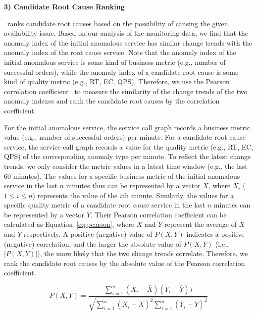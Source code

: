 \textbf{3) Candidate Root Cause Ranking}

\app~ranks candidate root causes based on the possibility of causing the given availability issue.
Based on our analysis of the monitoring data, we find that the anomaly index of the initial anomalous service has similar change trends with the anomaly index of the root cause service.
Note that the anomaly index of the initial anomalous service is some kind of business metric (e.g., number of successful orders), while the anomaly index of a candidate root cause is some kind of quality metric (e.g., RT, EC, QPS).
Therefore, we use the Pearson correlation coefficient~\cite{perlationcorrelation} to measure the similarity of the change trends of the two anomaly indexes and rank the candidate root causes by the correlation coefficient.

For the initial anomalous service, the service call graph records a business metric value (e.g., number of successful orders) per minute.
For a candidate root cause service, the service call graph records a value for the quality metric (e.g., RT, EC, QPS) of the corresponding anomaly type per minute.
To reflect the latest change trends, we only consider the metric values in a latest time window (e.g., the last 60 minutes).
The values for a specific business metric of the initial anomalous service in the last $n$ minutes thus can be represented by a vector $X$, where $X_i$ ($1 \leq i \leq n$) represents the value of the $i$th minute.
Similarly, the values for a specific quality metric of a candidate root cause service in the last $n$ minutes can be represented by a vector $Y$.
Their Pearson correlation coefficient can be calculated as Equation~\ref{eq:pearson}, where $\bar{X}$ and $\bar{Y}$ represent the average of $X$ and $Y$ respectively.
A positive (negative) value of $P(X, Y)$ indicates a positive (negative) correlation; and the larger the absolute value of $P(X, Y)$ (i.e., $|P(X, Y)|$), the more likely that the two change trends correlate.
Therefore, we rank the candidate root causes by the absolute value of the Pearson correlation coefficient.

\begin{equation}
\label{eq:pearson}
P(X, Y) =  \frac{ \sum_{i=1}^{n} (X_i -\bar{X})(Y_i - \bar{Y})  )}{\sqrt{\sum_{i=1}^{n} (X_i - \bar{X})^2\sum_{i=1}^{n} (Y_i - \bar{Y})^2}}
\end{equation}




